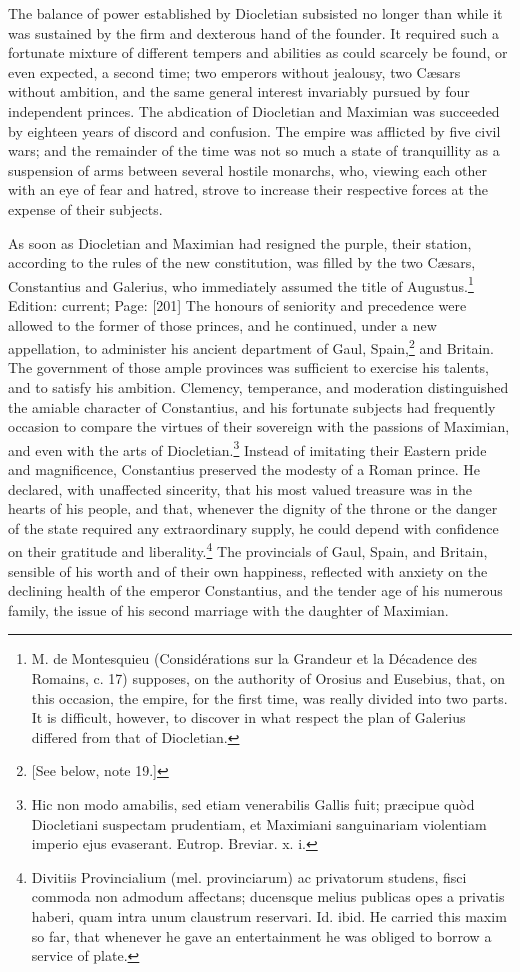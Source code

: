 The balance of power established by Diocletian subsisted no longer than while it was sustained by the firm and dexterous hand of the founder. It required such a fortunate mixture of different tempers and abilities as could scarcely be found, or even expected, a second time; two emperors without jealousy, two Cæsars without ambition, and the same general interest invariably pursued by four independent princes. The abdication of Diocletian and Maximian was succeeded by eighteen years of discord and confusion. The empire was afflicted by five civil wars; and the remainder of the time was not so much a state of tranquillity as a suspension of arms between several hostile monarchs, who, viewing each other with an eye of fear and hatred, strove to increase their respective forces at the expense of their subjects.

As soon as Diocletian and Maximian had resigned the purple, their station, according to the rules of the new constitution, was filled by the two Cæsars, Constantius and Galerius, who immediately assumed the title of Augustus.\footnote{M. de Montesquieu (Considérations sur la Grandeur et la Décadence des Romains, c. 17) supposes, on the authority of Orosius and Eusebius, that, on this occasion, the empire, for the first time, was really divided into two parts. It is difficult, however, to discover in what respect the plan of Galerius differed from that of Diocletian.} Edition: current; Page: [201] The honours of seniority and precedence were allowed to the former of those princes, and he continued, under a new appellation, to administer his ancient department of Gaul, Spain,\footnote{[See below, note 19.]} and Britain. The government of those ample provinces was sufficient to exercise his talents, and to satisfy his ambition. Clemency, temperance, and moderation distinguished the amiable character of Constantius, and his fortunate subjects had frequently occasion to compare the virtues of their sovereign with the passions of Maximian, and even with the arts of Diocletian.\footnote{Hic non modo amabilis, sed etiam venerabilis Gallis fuit; præcipue quòd Diocletiani suspectam prudentiam, et Maximiani sanguinariam violentiam imperio ejus evaserant. Eutrop. Breviar. x. i.} Instead of imitating their Eastern pride and magnificence, Constantius preserved the modesty of a Roman prince. He declared, with unaffected sincerity, that his most valued treasure was in the hearts of his people, and that, whenever the dignity of the throne or the danger of the state required any extraordinary supply, he could depend with confidence on their gratitude and liberality.\footnote{Divitiis Provincialium (mel. provinciarum) ac privatorum studens, fisci commoda non admodum affectans; ducensque melius publicas opes a privatis haberi, quam intra unum claustrum reservari. Id. ibid. He carried this maxim so far, that whenever he gave an entertainment he was obliged to borrow a service of plate.} The provincials of Gaul, Spain, and Britain, sensible of his worth and of their own happiness, reflected with anxiety on the declining health of the emperor Constantius, and the tender age of his numerous family, the issue of his second marriage with the daughter of Maximian.

